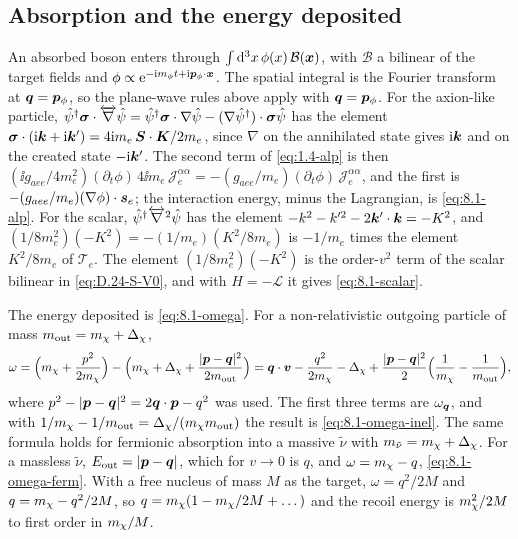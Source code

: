 \subsection{Absorption and the energy deposited}

An absorbed boson enters through $\int\mathrm{d}^3x\,\phi(x)\,\mathcal{B}(\bm{x})$, with $\mathcal{B}$ a bilinear of the target fields and $\phi \propto \mathrm{e}^{-\mathrm{i} m_\phi t + \mathrm{i}\bm{p}_\phi\cdot\bm{x}}$. The spatial integral is the Fourier transform at $\bm{q} = \bm{p}_\phi$, so the plane-wave rules above apply with $\bm{q} = \bm{p}_\phi$. For the axion-like particle, $\hat{\psi}^\dagger\boldsymbol{\sigma}\cdot\overleftrightarrow{\nabla}\hat{\psi} = \hat{\psi}^\dagger\boldsymbol{\sigma}\cdot\nabla\hat{\psi} - (\nabla\hat{\psi}^\dagger)\cdot\boldsymbol{\sigma}\hat{\psi}$ has the element $\boldsymbol{\sigma}\cdot(\mathrm{i}\bm{k} + \mathrm{i}\bm{k}') = 4\mathrm{i} m_e\,\bm{S}\cdot\bm{K}/2m_e$, since $\nabla$ on the annihilated state gives $\mathrm{i}\bm{k}$ and on the created state $-\mathrm{i}\bm{k}'$. The second term of \cref{eq:1.4-alp} is then $(\ii g_{aee}/4m_e^2)(\partial_t\phi)\,4\ii m_e\,\mathcal{J}^{\alpha\alpha}_e = -(g_{aee}/m_e)(\partial_t\phi)\,\mathcal{J}^{\alpha\alpha}_e$, and the first is $-(g_{aee}/m_e)(\nabla\phi)\cdot\bm{s}_e$; the interaction energy, minus the Lagrangian, is \cref{eq:8.1-alp}. For the scalar, $\hat{\psi}^\dagger\overleftrightarrow{\nabla}^2\hat{\psi}$ has the element $-k^2 - k'^2 - 2\bm{k}'\cdot\bm{k} = -K^2$, and $(1/8m_e^2)(-K^2) = -(1/m_e)(K^2/8m_e)$ is $-1/m_e$ times the element $K^2/8m_e$ of $\mathcal{T}_e$. The element $(1/8m_e^2)(-K^2)$ is the order-$v^2$ term of the scalar bilinear in \cref{eq:D.24-S-V0}, and with $H = -\mathcal{L}$ it gives \cref{eq:8.1-scalar}.

The energy deposited is \cref{eq:8.1-omega}. For a non-relativistic outgoing particle of mass $m_{\mathrm{out}} = m_{\chi} + \Delta_\chi$,
\begin{equation*}
  \omega = \Bigl(m_{\chi} + \frac{p^2}{2m_{\chi}}\Bigr) - \Bigl(m_{\chi} + \Delta_\chi + \frac{|\bm{p} - \bm{q}|^2}{2m_{\mathrm{out}}}\Bigr)
  = \bm{q}\cdot\bm{v} - \frac{q^2}{2m_{\chi}} - \Delta_\chi + \frac{|\bm{p} - \bm{q}|^2}{2}\Bigl(\frac{1}{m_{\chi}} - \frac{1}{m_{\mathrm{out}}}\Bigr) ,
\end{equation*}
where $p^2 - |\bm{p} - \bm{q}|^2 = 2\bm{q}\cdot\bm{p} - q^2$ was used. The first three terms are $\omega_{\bm{q}}$, and with $1/m_{\chi} - 1/m_{\mathrm{out}} = \Delta_\chi/(m_{\chi} m_{\mathrm{out}})$ the result is \cref{eq:8.1-omega-inel}. The same formula holds for fermionic absorption into a massive $\tilde\nu$ with $m_{\tilde\nu} = m_{\chi} + \Delta_\chi$. For a massless $\tilde\nu$, $E_{\mathrm{out}} = |\bm{p} - \bm{q}|$, which for $v \to 0$ is $q$, and $\omega = m_{\chi} - q$, \cref{eq:8.1-omega-ferm}. With a free nucleus of mass $M$ as the target, $\omega = q^2/2M$ and $q = m_{\chi} - q^2/2M$, so $q = m_{\chi}(1 - m_{\chi}/2M + \dots)$ and the recoil energy is $m_{\chi}^2/2M$ to first order in $m_{\chi}/M$.
